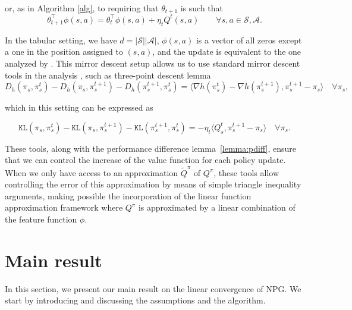 \documentclass[a4paper,12pt]{article}
\numberwithin{theorem}{section}
\newcommand\A{\mathcal{A}}
\renewcommand\S{\mathcal{S}}
\newcommand\1{\mathbf{1}}
\newcommand\KL{\mathtt{KL}}
\begin{document}
or, as in Algorithm \ref{alg}, to requiring that $\theta_{t + 1}$ is such that
 \[\theta_{t + 1}^\top\phi(s,a) = \theta_t^\top\phi(s,a) + \eta_t Q^t(s,a) \qquad \forall s,a\in\S,\A.\]

In the tabular setting, we have $d = |\S||\A|$, $\phi(s,a)$ is a vector of all zeros except a one in the position assigned to $(s,a)$, and the update is equivalent to the one analyzed by \citep{RN265}. 
This mirror descent setup allows us to use standard mirror descent tools in the analysis \citep{RN186, RN279, RN266}, such as three-point descent lemma
\begin{equation}
	\label{eq:breg}
	D_h(\pi_s,\pi^t_s) - D_h(\pi_s,\pi^{t+1}_s) - D_h(\pi^{t+1}_s,\pi^t_s) = \langle \nabla h(\pi^t_s)-\nabla h(\pi^{t+1}_s),\pi^{t+1}_s - \pi_s\rangle\quad\forall\pi_s,
\end{equation}

which in this setting can be expressed as

\begin{equation}
	\label{eq:kl}
	\KL(\pi_s,\pi^t_s) - \KL(\pi_s,\pi^{t+1}_s) - \KL(\pi^{t+1}_s,\pi^t_s) = -\eta_t\langle Q^t_s,\pi^{t+1}_s - \pi_s\rangle\quad\forall\pi_s.	
\end{equation}

These tools, along with the performance difference lemma~\eqref{lemma:pdiff}, ensure that we can control the increase of the value function for each policy update. When we only have access to an approximation $\widetilde{Q}^\pi$ of $Q^\pi$, these tools allow controlling the error of this approximation by means of simple triangle inequality arguments, making possible the incorporation of the linear function approximation framework where $Q^\pi$ is approximated by a linear combination of the feature function $\phi$.




\section{Main result}
\label{sec:main}
In this section, we present our main result on the linear convergence of NPG. We start by introducing and discussing the assumptions and the algorithm.
\end{document}

